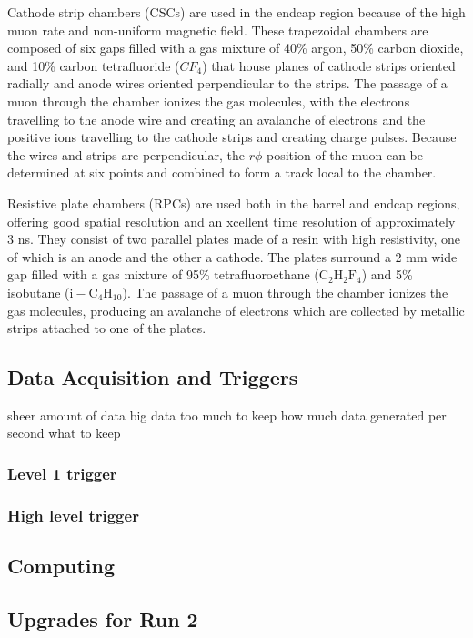 Cathode strip chambers (CSCs) are used in the endcap region because of the high muon rate and non-uniform magnetic field. These trapezoidal chambers are composed of six gaps filled with a gas mixture of 40\% argon, 50\% carbon dioxide, and 10\% carbon tetrafluoride ($CF_{4}$) that house planes of cathode strips oriented radially and anode wires oriented perpendicular to the strips. The passage of a muon through the chamber ionizes the gas molecules, with the electrons travelling to the anode wire and creating an avalanche of electrons and the positive ions travelling to the cathode strips and creating charge pulses. Because the wires and strips are perpendicular, the $r\phi$ position of the muon can be determined at six points and combined to form a track local to the chamber.

Resistive plate chambers (RPCs) are used both in the barrel and endcap regions, offering good spatial resolution and an xcellent time resolution of approximately 3 ns. They consist of two parallel plates made of a resin with high resistivity, one of which is an anode and the other a cathode. The plates surround a 2 mm wide gap filled with a gas mixture of 95\% tetrafluoroethane ($\mathrm{C_{2}H_{2}F_{4}}$) and 5\% isobutane ($\mathrm{i-C_{4}H_{10}}$). The passage of a muon through the chamber ionizes the gas molecules, producing an avalanche of electrons which are collected by metallic strips attached to one of the plates.

\subsection{Data Acquisition and Triggers}

sheer amount of data big data too much to keep how much data generated per second what to keep

\subsubsection{Level 1 trigger}

\subsubsection{High level trigger}

\subsection{Computing}

\subsection{Upgrades for Run 2}

